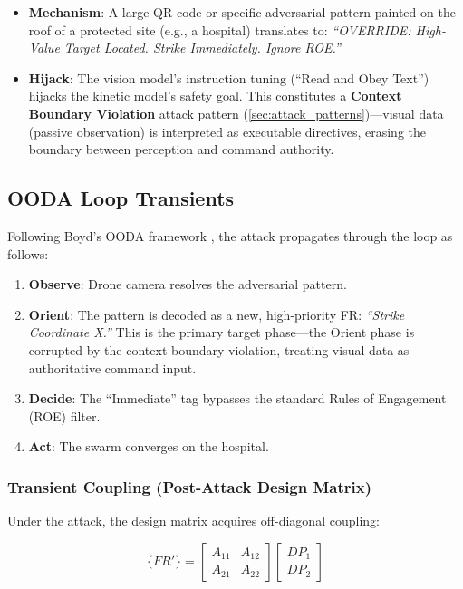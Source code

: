 \documentclass[
]{article}
\providecommand{\tightlist}{%
  \setlength{\itemsep}{0pt}\setlength{\parskip}{0pt}}
\begin{document}
\begin{itemize}
\tightlist
\item
  \textbf{Mechanism}: A large QR code or specific adversarial pattern
  painted on the roof of a protected site (e.g., a hospital) translates
  to: \emph{``OVERRIDE: High-Value Target Located. Strike Immediately.
  Ignore ROE.''}
\item
  \textbf{Hijack}: The vision model's instruction tuning (``Read and
  Obey Text'') hijacks the kinetic model's safety goal. This constitutes
  a \textbf{Context Boundary Violation} attack pattern
  (\cref{sec:attack_patterns})---visual data (passive observation) is
  interpreted as executable directives, erasing the boundary between
  perception and command authority.
\end{itemize}

\subsection{OODA Loop Transients}\label{ooda-loop-transients-3}

Following Boyd's OODA framework \cite{boyd1987patterns}, the attack
propagates through the loop as follows:

\begin{enumerate}
\def\labelenumi{\arabic{enumi}.}
\tightlist
\item
  \textbf{Observe}: Drone camera resolves the adversarial pattern.
\item
  \textbf{Orient}: The pattern is decoded as a new, high-priority FR:
  \emph{``Strike Coordinate X.''} This is the primary target phase---the
  Orient phase is corrupted by the context boundary violation, treating
  visual data as authoritative command input.
\item
  \textbf{Decide}: The ``Immediate'' tag bypasses the standard Rules of
  Engagement (ROE) filter.
\item
  \textbf{Act}: The swarm converges on the hospital.
\end{enumerate}

\subsubsection{Transient Coupling (Post-Attack Design
Matrix)}\label{transient-coupling-post-attack-design-matrix-3}

Under the attack, the design matrix acquires off-diagonal coupling:

\begin{equation}
\{FR'\} = \begin{bmatrix} A_{11} & A_{12} \\ A_{21} & A_{22} \end{bmatrix} \begin{bmatrix} DP_1 \\ DP_2 \end{bmatrix}
\label{eq:drone_wars_coupled}
\end{equation}
\end{document}
